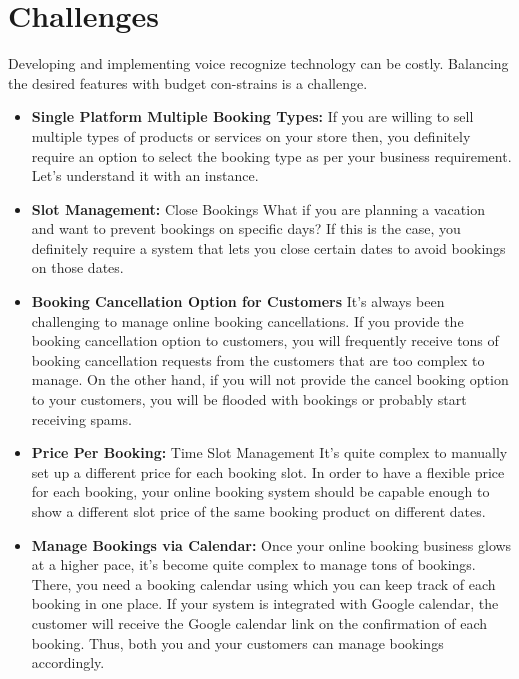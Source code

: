 \documentclass[oneside,a4paper,12pt]{report}
\begin{document}
\section{Challenges}
Developing and implementing voice recognize technology can be costly. Balancing the desired features with budget con-strains is a challenge. 
\begin{itemize}
    \item \textbf{Single Platform Multiple Booking Types: }
If you are willing to sell multiple types of products or services on your store then, you definitely require an option to select the booking type as per your business requirement. Let’s understand it with an instance. 
    \item \textbf{Slot Management:} Close Bookings 
What if you are planning a vacation and want to prevent bookings on specific days? If this is the case, you definitely require a system that lets you close certain dates to avoid bookings on those dates.
    \item \textbf{Booking Cancellation Option for Customers }
It’s always been challenging to manage online booking cancellations. 
If you provide the booking cancellation option to customers, you will frequently receive tons of booking cancellation requests from the customers that are too complex to manage. On the other hand, if you will not provide the cancel booking option to your customers, you will be flooded with bookings or probably start receiving spams. 

    \item \textbf{Price Per Booking:} Time Slot Management 
It’s quite complex to manually set up a different price for each booking slot. In order to have a flexible price for each booking, your online booking system should be capable enough to show a different slot price of the same booking product on different dates. 

    \item \textbf{ Manage Bookings via Calendar:}
Once your online booking business glows at a higher pace, it’s become quite complex to manage tons of bookings. There, you need a booking calendar using which you can keep track of each booking in one place. 
If your system is integrated with Google calendar, the customer will receive the Google calendar link on the confirmation of each booking. Thus, both you and your customers can manage bookings accordingly.
\end{itemize}
\end{document}
